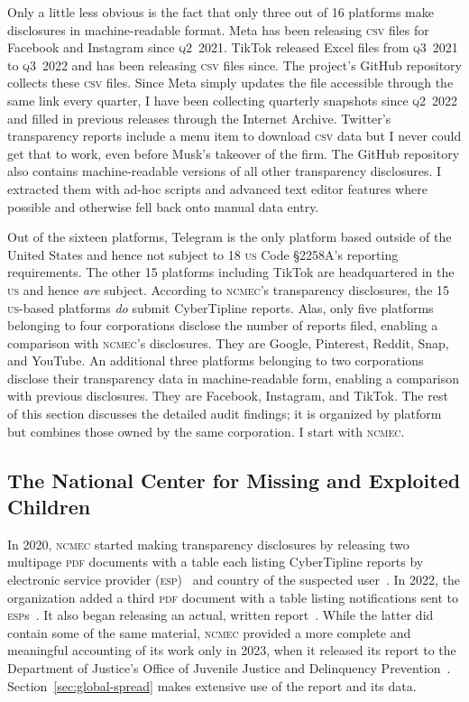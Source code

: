 \documentclass[nonacm,screen]{acmart}
\newcommand\V[1]{\textsc{\MakeLowercase{#1}}}
\begin{document}
Only a little less obvious is the fact that only three out of 16 platforms make
disclosures in machine-readable format. Meta has been releasing \V{CSV} files
for Facebook and Instagram since \V{Q2}~2021. TikTok released Excel files from
\V{Q3}~2021 to \V{Q3}~2022 and has been releasing \V{CSV} files since. The
project's GitHub repository collects these \V{CSV} files. Since Meta simply
updates the file accessible through the same link every quarter, I have been
collecting quarterly snapshots since \V{Q2}~2022 and filled in previous releases
through the Internet Archive. Twitter's transparency reports include a menu item
to download \V{CSV} data but I never could get that to work, even before Musk's
takeover of the firm. The GitHub repository also contains machine-readable
versions of all other transparency disclosures. I extracted them with ad-hoc
scripts and advanced text editor features where possible and otherwise fell back
onto manual data entry.

Out of the sixteen platforms, Telegram is the only platform based outside of the
United States and hence not subject to 18 \V{US} Code \S2258A's reporting
requirements. The other 15 platforms including TikTok are headquartered in the
\V{US} and hence \emph{are} subject. According to \V{NCMEC}'s transparency
disclosures, the 15 \V{US}-based platforms \emph{do} submit CyberTipline
reports. Alas, only five platforms belonging to four corporations disclose the
number of reports filed, enabling a comparison with \V{NCMEC}'s disclosures.
They are Google, Pinterest, Reddit, Snap, and YouTube. An additional three
platforms belonging to two corporations disclose their transparency data in
machine-readable form, enabling a comparison with previous disclosures. They are
Facebook, Instagram, and TikTok. The rest of this section discusses the detailed
audit findings; it is organized by platform but combines those owned by the same
corporation. I start with \V{NCMEC}.


\subsection{The National Center for Missing and Exploited Children}

In 2020, \V{NCMEC} started making transparency disclosures by releasing two
multipage \V{PDF} documents with a table each listing CyberTipline reports by
electronic service provider (\V{ESP})~\cite{NcmecByPlatform2019,
NcmecByPlatform2020,NcmecByPlatform2021,NcmecByPlatform2022} and country of the
suspected user~\cite{NcmecByCountry2019,NcmecByCountry2020,NcmecByCountry2021,
NcmecByCountry2020}. In 2022, the organization added a third \V{PDF} document
with a table listing notifications sent to
\V{ESP}s~\cite{NcmecNotifications2021,NcmecNotifications2022}. It also began
releasing an actual, written
report~\cite{NcmecCyberTipline2021,NcmecCyberTipline2022}. While the latter did
contain some of the same material, \V{NCMEC} provided a more complete and
meaningful accounting of its work only in 2023, when it released its report to
the Department of Justice's Office of Juvenile Justice and Delinquency
Prevention~\cite{NCMEC2023}. Section~\ref{sec:global-spread} makes extensive use
of the report and its data.
\end{document}
